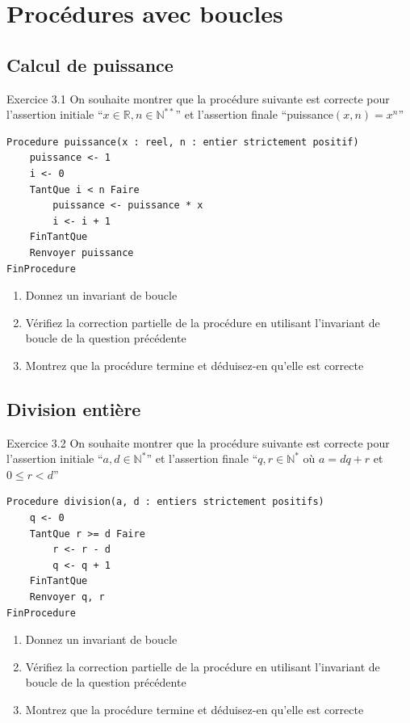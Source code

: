 \documentclass[a4paper,11pt]{article}
\begin{document}
\section{Procédures avec boucles}

\subsection{Calcul de puissance}

\begin{exercisebox}{Exercice 3.1}
On souhaite montrer que la procédure suivante est correcte pour l'assertion initiale ``$x \in \mathbb{R}, n \in \mathbb{N}^{**}$'' et l'assertion finale ``puissance$(x, n) = x^n$''

\begin{lstlisting}
Procedure puissance(x : reel, n : entier strictement positif)
    puissance <- 1
    i <- 0
    TantQue i < n Faire
        puissance <- puissance * x
        i <- i + 1
    FinTantQue
    Renvoyer puissance
FinProcedure
\end{lstlisting}

\begin{enumerate}
    \item Donnez un invariant de boucle
    \item Vérifiez la correction partielle de la procédure en utilisant l'invariant de boucle de la question précédente
    \item Montrez que la procédure termine et déduisez-en qu'elle est correcte
\end{enumerate}
\end{exercisebox}

\subsection{Division entière}

\begin{exercisebox}{Exercice 3.2}
On souhaite montrer que la procédure suivante est correcte pour l'assertion initiale ``$a, d \in \mathbb{N}^*$'' et l'assertion finale ``$q, r \in \mathbb{N}^*$ où $a = dq + r$ et $0 \leq r < d$''

\begin{lstlisting}
Procedure division(a, d : entiers strictement positifs)
    q <- 0
    TantQue r >= d Faire
        r <- r - d
        q <- q + 1
    FinTantQue
    Renvoyer q, r
FinProcedure
\end{lstlisting}

\begin{enumerate}
    \item Donnez un invariant de boucle
    \item Vérifiez la correction partielle de la procédure en utilisant l'invariant de boucle de la question précédente
    \item Montrez que la procédure termine et déduisez-en qu'elle est correcte
\end{enumerate}
\end{exercisebox}
\end{document}
